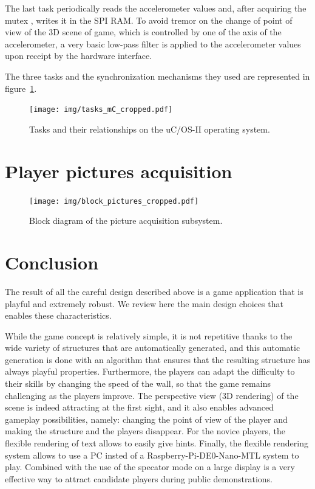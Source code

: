 \documentclass[english, DIV=13]{scrartcl}
\begin{document}
The last task periodically reads the accelerometer values and, after acquiring the mutex
, writes it in the SPI RAM. To avoid tremor on the change of point of
view of the 3D scene of game, which is controlled by one of the axis of the
accelerometer, a very basic low-pass filter is applied to the accelerometer values upon
receipt by the hardware interface.

The three tasks and the synchronization mechanisms they used are represented in
figure~\ref{fig:tasks-mc}.

\begin{figure}
    \centering
    \texttt{[image: img/tasks\_mC\_cropped.pdf]}
    \caption{Tasks and their relationships on the uC/OS-II operating system.}
    \label{fig:tasks-mc}
\end{figure}


\section{Player pictures acquisition}
\label{sec:pic-acq}

\begin{figure}
    \centering
    \texttt{[image: img/block\_pictures\_cropped.pdf]}
    \caption{Block diagram of the picture acquisition subsystem.}
\end{figure}

\section{Conclusion}

The result of all the careful design described above is a game application that is playful
and extremely robust. We review here the main design choices that enables these characteristics.

While the game concept is relatively simple, it is not repetitive thanks to the wide variety
of structures that are automatically generated, and this automatic generation is done with
an algorithm that ensures that the resulting structure has always playful properties.
Furthermore, the players can adapt the difficulty to their skills by changing the speed of the wall,
so that the game remains challenging as the players improve.
The perspective view (3D rendering) of the scene is indeed attracting at the first sight,
and it also enables advanced gameplay possibilities, namely: changing the point of view of the player and
making the structure and the players disappear.
For the novice players, the flexible rendering of text allows to easily give hints.
Finally, the flexible rendering system allows to use a PC insted of a Raspberry-Pi-DE0-Nano-MTL system to play.
Combined with the use of the specator mode on a large display is a very effective way to attract candidate players
during public demonstrations.
\end{document}
